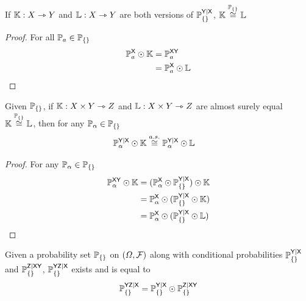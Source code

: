 \begin{lemma}
If $\mathbb{K}:X\rightarrowtriangle Y$ and $\mathbb{L}:X\rightarrowtriangle Y$ are both versions of $\mathbb{P}_{\{\}}^{\mathsf{Y}|\mathsf{X}}$, $\mathbb{K}\overset{\mathbb{P}_{\{\}}}{\cong}\mathbb{L}$
\end{lemma}

\begin{proof}
For all $\mathbb{P}_a \in \mathbb{P}_{\{\}}$
\begin{align}
	\mathbb{P}^{\mathsf{X}}_a\odot \mathbb{K} &= \mathbb{P}^{\mathsf{XY}}_a\\
	&= \mathbb{P}^{\mathsf{X}}_a\odot \mathbb{L}
\end{align}
\end{proof}

\begin{lemma}
Given $\mathbb{P}_{\{\}}$, if $\mathbb{K}:X\times Y \rightarrowtriangle Z$ and $\mathbb{L}:X\times Y \rightarrowtriangle Z$ are almost surely equal $\mathbb{K}\overset{\mathbb{P}_{\{\}}}{\cong}\mathbb{L}$, then for any $\mathbb{P}_\alpha\in \mathbb{P}_{\{\}}$
\begin{align}
	\mathbb{P}_\alpha^{\mathsf{Y}|\mathsf{X}}\odot \mathbb{K} &\overset{a.s.}{\cong} \mathbb{P}_\alpha^{\mathsf{Y}|\mathsf{X}}\odot \mathbb{L}
\end{align}
\end{lemma}

\begin{proof}
For any $\mathbb{P}_\alpha\in\mathbb{P}_{\{\}}$
\begin{align}
	\mathbb{P}_\alpha^{\mathsf{XY}}\odot \mathbb{K} &= (\mathbb{P}_\alpha^{\mathsf{X}}\odot \mathbb{P}_{\{\}}^{\mathsf{Y}|\mathsf{X}})\odot \mathbb{K}\\
											  &= \mathbb{P}_\alpha^{\mathsf{X}}\odot (\mathbb{P}_{\{\}}^{\mathsf{Y}|\mathsf{X}}\odot \mathbb{K})\\
											  &= \mathbb{P}_\alpha^{\mathsf{X}}\odot (\mathbb{P}_{\{\}}^{\mathsf{Y}|\mathsf{X}}\odot \mathbb{L})
\end{align}
\end{proof}

\begin{lemma}\label{lem:joint_conditional}
Given a probability set $\mathbb{P}_{\{\}}$ on $(\Omega,\mathcal{F})$ along with conditional probabilities $\mathbb{P}_{\{\}}^{\mathsf{Y}|\mathsf{X}}$ and $\mathbb{P}_{\{\}}^{\mathsf{Z}|\mathsf{XY}}$, $\mathbb{P}_{\{\}}^{\mathsf{YZ}|\mathsf{X}}$ exists and is equal to
\begin{align}
	\mathbb{P}_{\{\}}^{\mathsf{YZ}|\mathsf{X}} &= \mathbb{P}_{\{\}}^{\mathsf{Y}|\mathsf{X}}\odot \mathbb{P}_{\{\}}^{\mathsf{Z}|\mathsf{XY}}\\
\end{align}
\end{lemma}

